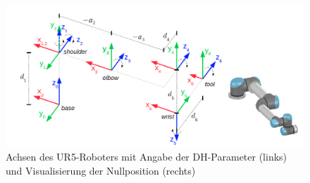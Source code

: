 \begin{figure}[h]
    \centering
    \includegraphics[width = .9\textwidth]{Bilder/ur5-axis}
    \caption{Achsen des UR5-Roboters mit Angabe der DH-Parameter (links) und Visualisierung der Nullposition (rechts)~\cite{rasmusandersenKinematicsUR52018}}\label{fig:ur5-axis}
\end{figure}

